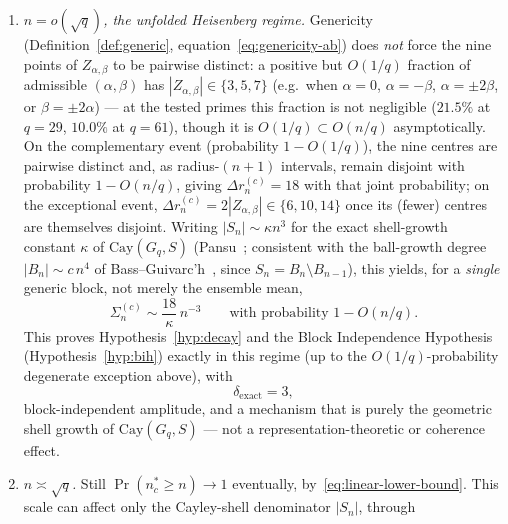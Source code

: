     \begin{enumerate}
      \item[\textbf{(i)}] \emph{$n=o(\sqrt{q})$, the unfolded Heisenberg regime.}
        Genericity (Definition~\ref{def:generic}, equation~\eqref{eq:genericity-ab}) does
        \emph{not} force the nine points of $Z_{\alpha,\beta}$ to be pairwise distinct: a
        positive but $O(1/q)$ fraction of admissible $(\alpha,\beta)$ has
        $|Z_{\alpha,\beta}|\in\{3,5,7\}$ (e.g.\ when $\alpha=0$, $\alpha=-\beta$,
        $\alpha=\pm2\beta$, or $\beta=\pm2\alpha$) — at the tested primes this fraction is
        not negligible
        ($21.5\%$ at $q=29$, $10.0\%$ at $q=61$), though it is $O(1/q)\subset O(n/q)$
        asymptotically.
        On the complementary event (probability $1-O(1/q)$), the nine centres are pairwise
        distinct and, as radius-$(n{+}1)$ intervals, remain disjoint with probability
        $1-O(n/q)$, giving $\Delta r_n^{(c)}=18$ with that joint probability; on the
        exceptional event, $\Delta r_n^{(c)}=2|Z_{\alpha,\beta}|\in\{6,10,14\}$ once its
        (fewer) centres are themselves disjoint.
        Writing $|S_n|\sim\kappa n^3$ for the exact shell-growth constant $\kappa$ of
        $\mathrm{Cay}(G_q,S)$ (Pansu~\cite{Pansu1983}; consistent with the ball-growth degree
        $|B_n|\sim c\,n^4$ of Bass--Guivarc'h~\cite{Bass1972,Guivarch1973}, since
        $S_n=B_n\setminus B_{n-1}$), this yields,
        for a \emph{single} generic block, not merely the ensemble mean,
        \begin{equation}
          \Sigma_n^{(c)} \sim \frac{18}{\kappa}\,n^{-3}
          \qquad\text{with probability } 1-O(n/q).
          \label{eq:unfolded-decay}
        \end{equation}
        This proves Hypothesis~\ref{hyp:decay} and the Block Independence Hypothesis
        (Hypothesis~\ref{hyp:bih}) exactly in this regime (up to the $O(1/q)$-probability
        degenerate exception above), with
        \begin{equation}
          \delta_{\mathrm{exact}} = 3,
          \label{eq:delta-3}
        \end{equation}
        block-independent amplitude, and a mechanism that is purely the geometric shell
        growth of $\mathrm{Cay}(G_q,S)$ — not a representation-theoretic or coherence effect.
      \item[\textbf{(ii)}] \emph{$n\asymp\sqrt{q}$.}
        Still $\Pr(n_c^*\geq n)\to 1$ eventually, by~\eqref{eq:linear-lower-bound}.
        This scale can affect only the Cayley-shell denominator $|S_n|$, through

\end{enumerate}
